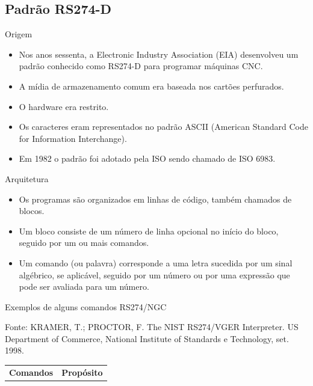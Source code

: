 \documentclass[aspectratio=169]{beamer}
\begin{document}
{\subsection{Padrão RS274-D}

\begin{frame}{Origem}
  \begin{itemize}
  \item {
    Nos anos sessenta, a Electronic Industry Association (EIA) desenvolveu um 
    padrão conhecido como RS274-D para programar máquinas CNC.
  }
  \item {
    A mídia de armazenamento comum era baseada nos cartões perfurados.
  }
  \item {
    O hardware era restrito.
  }
  \item {
    Os caracteres eram representados no padrão ASCII (American Standard Code for Information Interchange).
  }
  \item {
    Em 1982 o padrão foi adotado pela ISO sendo chamado de ISO 6983.
  }
  \end{itemize}
\end{frame}


\begin{frame}{Arquitetura}
  \begin{itemize}
  \item {
    Os programas são organizados em linhas de código, também chamados de blocos.
  }
  \item {
    Um bloco consiste de um número de linha opcional no início do bloco, seguido por um 
    ou mais comandos.
  }
  \item {
    Um comando (ou palavra) corresponde a uma letra sucedida por um sinal algébrico, se aplicável, 
    seguido por um número ou por uma expressão que pode ser avaliada para um número.
  }
  \end{itemize}
\end{frame}


\begin{frame}{Exemplos de alguns comandos RS274/NGC}

  \scriptsize{Fonte: KRAMER, T.; PROCTOR, F. 
    The NIST RS274/VGER Interpreter. US Department of
    Commerce, National Institute of Standards e Technology, set. 1998.}

  \begin{table}[H]
    \centering
    \begin{tabular}{p{7cm}|p{5cm}}
    
      \hline
      \bfseries{\scriptsize{Comandos}} & \bfseries{\scriptsize{Prop\'osito}} \\
  

\end{tabular}
\end{table}
\end{frame}}
\end{document}
